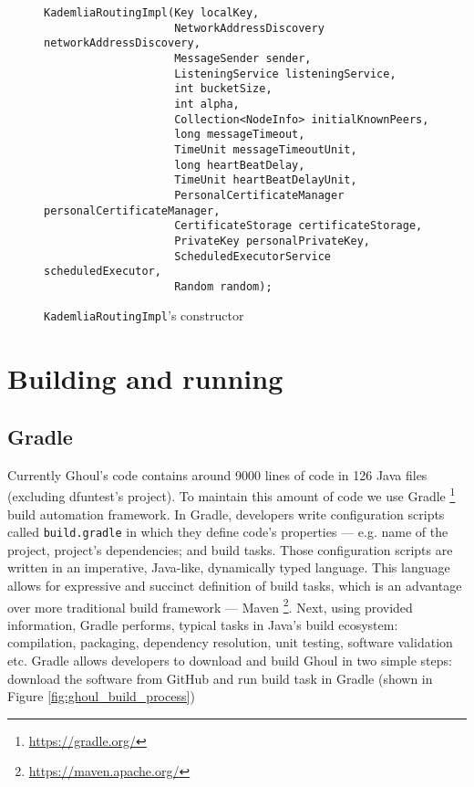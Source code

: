 \begin{figure}[tbp]
\begin{lstlisting}
KademliaRoutingImpl(Key localKey,
                    NetworkAddressDiscovery networkAddressDiscovery,
                    MessageSender sender,
                    ListeningService listeningService,
                    int bucketSize,
                    int alpha,
                    Collection<NodeInfo> initialKnownPeers,
                    long messageTimeout,
                    TimeUnit messageTimeoutUnit,
                    long heartBeatDelay,
                    TimeUnit heartBeatDelayUnit,
                    PersonalCertificateManager personalCertificateManager,
                    CertificateStorage certificateStorage,
                    PrivateKey personalPrivateKey,
                    ScheduledExecutorService scheduledExecutor,
                    Random random);
\end{lstlisting}
\caption{\texttt{KademliaRoutingImpl}'s constructor}
\label{fig:routing_constr_header}
\end{figure}

\section{Building and running}
\label{sec:build}

\subsection{Gradle}
Currently Ghoul's code contains around 9000 lines of code in 126 Java files
(excluding dfuntest's project).
To maintain this amount of code we use Gradle
\footnote{\url{https://gradle.org/}} build automation framework.
In Gradle, developers write configuration scripts called \texttt{build.gradle}
in which they define code's properties --- e.g. name of the project, project's
dependencies; and build tasks.
Those configuration scripts are written in an imperative, Java-like, dynamically
typed language.
This language allows for expressive and succinct definition of build tasks,
which is an advantage over more traditional build framework --- Maven
\footnote{\url{https://maven.apache.org/}}.
Next, using provided information, Gradle performs, typical tasks in Java's build
ecosystem: compilation, packaging, dependency resolution, unit testing, software
validation etc.
Gradle allows developers to download and build Ghoul in two simple steps:
download the software from GitHub and run build task in Gradle (shown in Figure
\ref{fig:ghoul_build_process})

